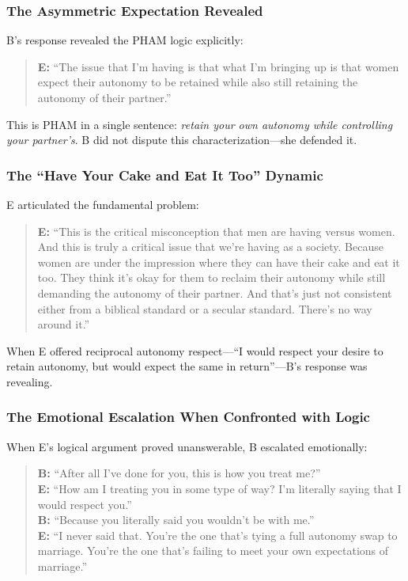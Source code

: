 \documentclass[12pt, letterpaper]{article}
\begin{document}
\subsubsection{The Asymmetric Expectation Revealed}

B's response revealed the PHAM logic explicitly:

\begin{quote}
\textbf{E:} ``The issue that I'm having is that what I'm bringing up is that women expect their autonomy to be retained while also still retaining the autonomy of their partner.''
\end{quote}

This is PHAM in a single sentence: \textit{retain your own autonomy while controlling your partner's}. B did not dispute this characterization---she defended it.

\subsubsection{The ``Have Your Cake and Eat It Too'' Dynamic}

E articulated the fundamental problem:

\begin{quote}
\textbf{E:} ``This is the critical misconception that men are having versus women. And this is truly a critical issue that we're having as a society. Because women are under the impression where they can have their cake and eat it too. They think it's okay for them to reclaim their autonomy while still demanding the autonomy of their partner. And that's just not consistent either from a biblical standard or a secular standard. There's no way around it.''
\end{quote}

When E offered reciprocal autonomy respect---``I would respect your desire to retain autonomy, but would expect the same in return''---B's response was revealing.

\subsubsection{The Emotional Escalation When Confronted with Logic}

When E's logical argument proved unanswerable, B escalated emotionally:

\begin{quote}
\textbf{B:} ``After all I've done for you, this is how you treat me?''\\
\textbf{E:} ``How am I treating you in some type of way? I'm literally saying that I would respect you.''\\
\textbf{B:} ``Because you literally said you wouldn't be with me.''\\
\textbf{E:} ``I never said that. You're the one that's tying a full autonomy swap to marriage. You're the one that's failing to meet your own expectations of marriage.''
\end{quote}
\end{document}
